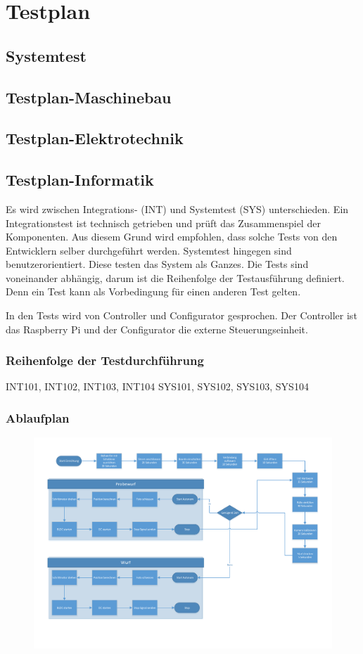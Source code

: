 \section{Testplan}

\subsection{Systemtest}

\subsection{Testplan-Maschinebau}

\subsection{Testplan-Elektrotechnik}

\subsection{Testplan-Informatik}

Es wird zwischen Integrations- (INT) und Systemtest (SYS) unterschieden. Ein Integrationstest
ist technisch getrieben und prüft das Zusammenspiel der Komponenten. Aus diesem
Grund wird empfohlen, dass solche Tests von den Entwicklern selber durchgeführt werden.
Systemtest hingegen sind benutzerorientiert. Diese testen das System als Ganzes.
Die Tests sind voneinander abhängig, darum ist die Reihenfolge der Testausführung
definiert. Denn ein Test kann als Vorbedingung für einen anderen Test gelten. 

In den Tests wird von Controller und Configurator gesprochen. Der Controller ist
das Raspberry Pi und der Configurator die externe Steuerungseinheit.

\subsubsection{Reihenfolge der Testdurchführung}
INT101, INT102, INT103, INT104
SYS101, SYS102, SYS103, SYS104

\subsubsection{Ablaufplan}
\begin{figure}
\centering
\includegraphics[width=0.7\linewidth]{../../fig/ablauf-ballwurf}
\caption{}
\label{fig:ablauf-ballwurf}
\end{figure}


